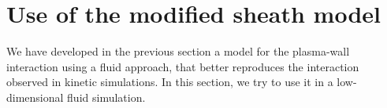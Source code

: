 

\section{Use of the modified sheath model} \label{subsec-applcation}

We have developed in the previous section a model for the plasma-wall interaction using a fluid approach, that better reproduces the interaction observed in kinetic simulations.
In this section, we try to use it in a low-dimensional fluid simulation.
